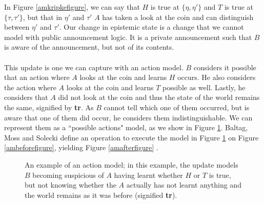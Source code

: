 In Figure \ref{amkripkefigure}, we can say that $H$ is true at $\{\eta,\eta'\}$ and $T$ is
true at $\{\tau,\tau'\}$, but that in $\eta'$ and $\tau'$ $A$ has taken a look
at the coin and can distinguish between $\eta'$ and $\tau'$.
Our change in epistemic state is a change that we cannot model with public
announcement logic.
It is a private announcement such that $B$ is aware of the announcement, but not
of its contents.\\
\\
This update is one we can capture with an action model.
$B$ considers it possible that an action where $A$ looks at the coin and learns
$H$ occurs.
He also considers the action where $A$ looks at the coin and learns $T$ possible
as well.
Lastly, he considers that $A$ did not look at the coin and thus the state of the
world remains the same, signified by {\bf tr}.
As $B$ cannot tell which one of them occurred, but is aware that one of them did
occur, he considers them indistinguishable.
We can represent them as a ``possible actions" model, as we show in Figure
\ref{amprivatea}.
Baltag, Moss and Solecki define an operation to execute the model in Figure
\ref{amprivatea} on Figure \ref{ambeforefigure}, yielding Figure
\ref{amafterfigure} \cite{baltag1998lpa}.

\begin{figure}[H]
\centering
{}
\caption{An example of an action model; in this example, the update models $B$
becoming suspicious of $A$ having learnt whether $H$ or $T$ is true, but not
knowing whether the $A$ actually has not learnt anything and the world remains
as it was before (signified {\bf tr}).}
\label{amprivatea}
\end{figure}

